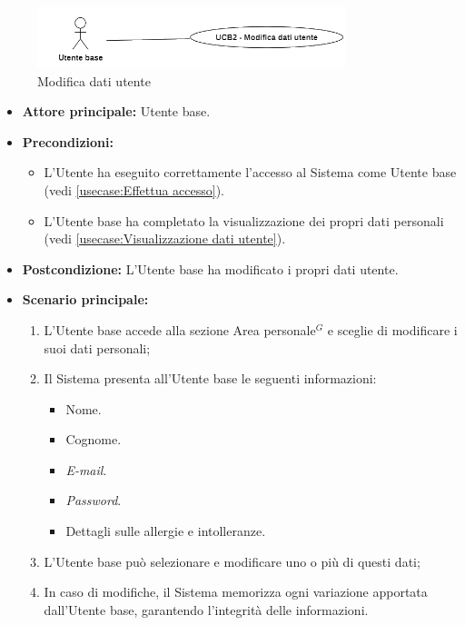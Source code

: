 \label{usecase:Modifica dati utente}

\begin{figure}[h]
	\centering
	\includegraphics[width=0.8\textwidth]{./uml/UCB2.png} 
	\caption{Modifica dati utente}
	\label{fig:UCB2}
  \end{figure}

\begin{itemize}
	\item \textbf{Attore principale:} Utente base.

	\item \textbf{Precondizioni:}
	      \begin{itemize}
		      \item L'Utente ha eseguito correttamente l'accesso al Sistema come Utente base (vedi \autoref{usecase:Effettua accesso}).
		      \item L'Utente base ha completato la visualizzazione dei propri
		            dati personali (vedi \autoref{usecase:Visualizzazione dati utente}).
	      \end{itemize}

	\item \textbf{Postcondizione:} L'Utente base ha modificato i propri dati utente.

	\item \textbf{Scenario principale:}
	      \begin{enumerate}
		      \item L'Utente base accede alla sezione Area personale$^G$ e sceglie di modificare i suoi dati personali;
		      \item Il Sistema presenta all'Utente base le seguenti informazioni:
		            \begin{itemize}
			            \item Nome.
			            \item Cognome.
			            \item \textit{E-mail}.
			            \item \textit{Password}.
			            \item Dettagli sulle allergie e intolleranze.
		            \end{itemize}
		      \item L'Utente base può selezionare e modificare uno o più di questi dati;
		      \item In caso di modifiche, il Sistema memorizza ogni variazione apportata dall'Utente base, garantendo l'integrità delle informazioni.
	      \end{enumerate}
\end{itemize}
